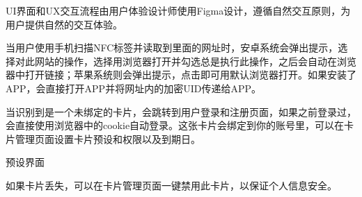 \documentclass[UTF8]{ctexart}
\begin{document}
UI界面和UX交互流程由用户体验设计师使用Figma设计，遵循自然交互原则，为用户提供自然的交互体验。

当用户使用手机扫描NFC标签并读取到里面的网址时，安卓系统会弹出提示，选择对此网站的操作，选择用浏览器打开并勾选总是执行此操作，之后会自动在浏览器中打开链接；苹果系统则会弹出提示，点击即可用默认浏览器打开。如果安装了APP，会直接打开APP并将网址内的加密UID传递给APP。

当识别到是一个未绑定的卡片，会跳转到用户登录和注册页面，如果之前登录过，会直接使用浏览器中的cookie自动登录。这张卡片会绑定到你的账号里，可以在卡片管理页面设置卡片预设和权限以及到期日。

预设界面

如果卡片丢失，可以在卡片管理页面一键禁用此卡片，以保证个人信息安全。

\begin{figure}[htbp]
    \centering
\end{figure}
\end{document}
